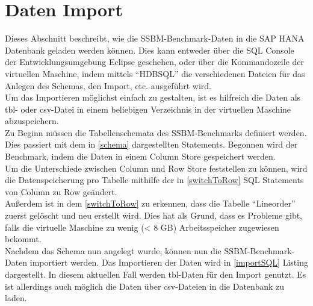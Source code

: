 \section{Daten Import}
Dieses Abschnitt beschreibt, wie die SSBM-Benchmark-Daten in die SAP HANA Datenbank geladen werden können. Dies kann entweder über die SQL Console der Entwicklungsumgebung Eclipse geschehen, oder über die Kommandozeile der virtuellen Maschine, indem mittels \enquote{HDBSQL} die verschiedenen Dateien für das Anlegen des Schemas, den Import, etc. ausgeführt wird.
\\Um das Importieren möglichst einfach zu gestalten, ist es hilfreich die Daten als tbl- oder csv-Datei in einem beliebigen Verzeichnis in der virtuellen Maschine abzuspeichern.
\\Zu Beginn müssen die Tabellenschemata des SSBM-Benchmarks definiert werden. Dies passiert mit dem in \autoref{schema} dargestellten Statements. Begonnen wird der Benchmark, indem die Daten in einem Column Store gespeichert werden.\\
Um die Unterschiede zwischen Column und Row Store feststellen zu können, wird die Datenspeicherung pro Tabelle mithilfe der in \autoref{switchToRow} SQL Statements von Column zu Row geändert. \\Außerdem ist in dem \autoref{switchToRow} zu erkennen, dass die Tabelle \enquote{Lineorder} zuerst gelöscht und neu erstellt wird. Dies hat als Grund, dass es Probleme gibt, falls die virtuelle Maschine zu wenig (< 8 GB) Arbeitsspeicher zugewiesen bekommt.\\
Nachdem das Schema nun angelegt wurde, können nun die SSBM-Benchmark-Daten importiert werden. Das Importieren der Daten wird in \autoref{importSQL} Listing dargestellt. In diesem aktuellen Fall werden tbl-Daten für den Import genutzt. Es ist allerdings auch möglich die Daten über csv-Dateien in die Datenbank zu laden.


